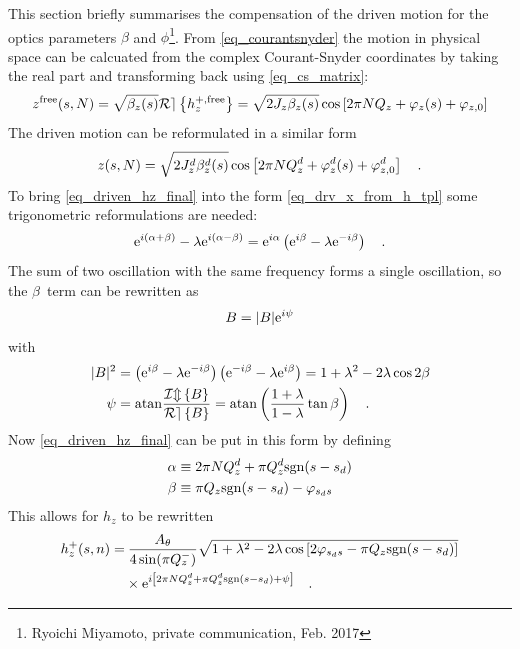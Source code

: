 This section briefly summarises the compensation of the driven motion for the optics parameters
$\beta$ and $\phi$\footnote{Ryoichi Miyamoto, private communication, Feb. 2017}.
From \eqref{eq_courantsnyder} the motion in physical space can be calcuated from the complex Courant-Snyder
coordinates by taking the real part and transforming back using \eqref{eq_cs_matrix}:
%
\begin{equation}
    z^{\text{free}}(s,N)=\sqrt{\beta_z(s)}\mathcal{Re} \left\{ h_z^{+,\text{free}} \right\}
    = \sqrt{2J_z \beta_z(s)}\cos\left[ 2\pi N Q_z + \varphi_z(s) + \varphi_{z,0} \right]
    \label{eq_free_x_from_h}
\end{equation}
%
The driven motion can be reformulated in a similar form \cite{Miyamoto2008}
%
\begin{equation}
    z(s,N) = \sqrt{2J_z^d\beta_{z}^d(s)}\cos\left[ 2\pi N Q_z^d + \varphi_z^d(s) + \varphi_{z,0}^d \right]
    \quad .
    \label{eq_drv_x_from_h_tpl}
\end{equation}
%
To bring \eqref{eq_driven_hz_final} into the form \eqref{eq_drv_x_from_h_tpl} some trigonometric reformulations
are needed:
%
\begin{equation}
  \text{e}^{i\left( \alpha + \beta \right)} - \lambda \text{e}^{i\left( \alpha - \beta \right)}
  = \text{e}^{i\alpha} \left(\text{e}^{i\beta} - \lambda\text{e}^{-i\beta}\right)
  \quad .
  \label{eq_e_alpha_lambda}
\end{equation}
%
The sum of two oscillation with the same frequency forms a single oscillation, so the $\beta$~term can
be rewritten as
%
\begin{equation}
  B = |B|\text{e}^{i\psi}
\end{equation}
with
%
\begin{align}
  |B|^2 &=  \left( \text{e}^{i\beta}-\lambda\text{e}^{-i\beta} \right)\left( \text{e}^{-i\beta} - \lambda\text{e}^{i\beta} \right)
  = 1+\lambda^2-2\lambda\cos{2\beta} \notag \\
  \psi&= \mathrm{atan} \frac{\mathcal{Im} \left\{ B \right\}}{\mathcal{Re} \left\{ B \right\}} = \mathrm{atan}\left(\frac{1+\lambda}{1-\lambda}\tan \beta\right)
  \quad .
\end{align}
%
Now \eqref{eq_driven_hz_final} can be put in this form by defining
%
\begin{align}
  \alpha &\equiv 2\pi N Q^{d}_{z} + \pi Q^{d}_{z} \text{sgn}(s-s_d) \notag \\
  \beta &\equiv \pi Q_z\text{sgn}(s-s_d) - \varphi_{s_ds}
\end{align}
%
This allows for $h_z$ to be rewritten
%
\begin{align}
  h_z^+(s,n) =&\: \frac{A_\theta}{4\sin(\pi Q_z^-)}
  \sqrt{1+\lambda^2-2\lambda\cos\left[2\varphi_{s_ds} - \pi Q_z\text{sgn}(s-s_d)\right]} \notag \\
  &\times\text{e}^{i\left[ 2\pi N Q^{d}_{z} + \pi Q^{d}_{z}\text{sgn}(s-s_d) + \psi \right]}
  \quad .
\end{align}
